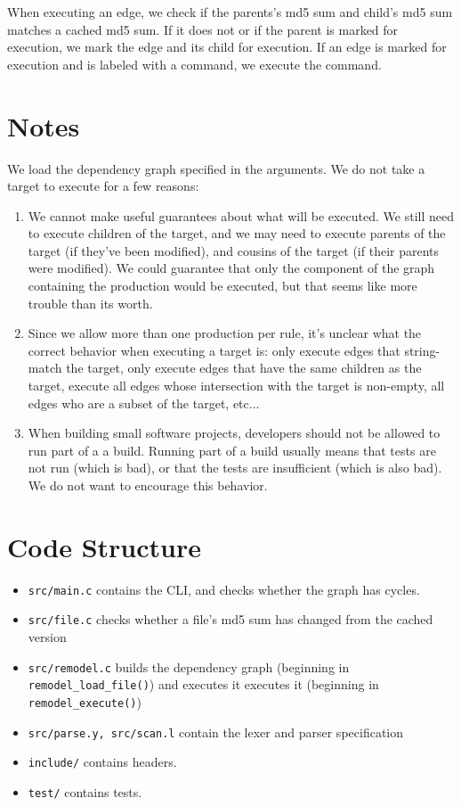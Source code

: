\documentclass{article}
\begin{document}
When executing an edge, we check if the parents's md5 sum and child's md5 sum matches a cached md5 sum. If it does not or if the parent is marked for execution, we mark the edge and its child for execution. If an edge is marked for execution and is labeled with a command, we execute the command.

\section{Notes}

We load the dependency graph specified in the arguments. We do not take a target to execute for a few reasons:
\begin{enumerate}
\item We cannot make useful guarantees about what will be executed. We still need to execute children of the target, and we may need to execute parents of the target (if they've been modified), and cousins of the target (if their parents were modified). We could guarantee that only the component of the graph containing the production would be executed, but that seems like more trouble than its worth.
\item Since we allow more than one production per rule, it's unclear what the correct behavior when executing a target is: only execute edges that string-match the target, only execute edges that have the same children as the target, execute all edges whose intersection with the target is non-empty, all edges who are a subset of the target, etc...
\item When building small software projects, developers should not be allowed to run part of a a build. Running part of a build usually means that tests are not run (which is bad), or that the tests are insufficient (which is also bad). We do not want to encourage this behavior.
\end{enumerate}

\section{Code Structure}

\begin{itemize}
\item \texttt{src/main.c} contains the CLI, and checks whether the graph has cycles.
\item \texttt{src/file.c} checks whether a file's md5 sum has changed from the cached version
\item \texttt{src/remodel.c} builds the dependency graph (beginning in \texttt{remodel\_load\_file()}) and executes it executes it (beginning in \texttt{remodel\_execute()})
\item \texttt{src/parse.y, src/scan.l} contain the lexer and parser specification
\item \texttt{include/} contains headers.
\item \texttt{test/} contains tests.
\end{itemize}

\raggedright
{}
\nocite{*}

\end{document}
